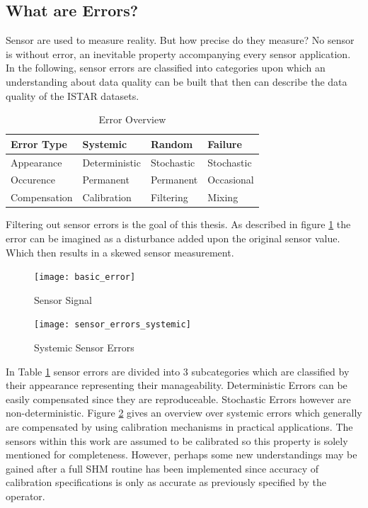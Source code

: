 \subsection{What are Errors?}



Sensor are used to measure reality. But how precise do they measure? No sensor is without error, an inevitable property accompanying every sensor application. In the following, sensor errors are classified into categories upon which an understanding about data quality can be built that then can describe the data quality of the ISTAR datasets.
\begin{table}[h]
    \centering
    \begin{tabular}{@{}llll@{}}
        \toprule
        Error Type   & Systemic      & Random     & Failure    \\ \midrule
        Appearance   & Deterministic & Stochastic & Stochastic \\
        Occurence    & Permanent     & Permanent  & Occasional \\
        Compensation & Calibration   & Filtering  & Mixing     \\ \bottomrule
    \end{tabular}
    \caption{Error Overview \cite{hartmann_navigation-sensordatenfusion_2022}}
    \label{tab:error_types}
\end{table}

Filtering out sensor errors is the goal of this thesis. As described in figure \ref{fig:basic_error} the error can be imagined as a disturbance added upon the original sensor value. Which then results in a skewed sensor measurement.

\begin{figure}[ht]
    \centering
    \texttt{[image: basic\_error]}
    \caption{Sensor Signal}
    \label{fig:basic_error}
\end{figure}


\begin{figure}
    \centering
    \vspace{-20pt}
    \texttt{[image: sensor\_errors\_systemic]}
    \caption{Systemic Sensor Errors \cite{hartmann_navigation-sensordatenfusion_2022, din_din_1995}}
    \label{fig:sensor_errors_systemic}
\end{figure}

In Table \ref{tab:error_types} sensor errors are divided into 3 subcategories which are classified by their appearance representing their manageability. Deterministic Errors can be easily compensated since they are reproduceable. Stochastic Errors however are non-deterministic. Figure \ref{fig:sensor_errors_systemic} gives an overview over systemic errors which generally are compensated by using calibration mechanisms in practical applications. The sensors within this work are assumed to be calibrated so this property is solely mentioned for completeness. However, perhaps some new understandings may be gained after a full SHM routine has been implemented since accuracy of calibration specifications is only as accurate as previously specified by the operator.

